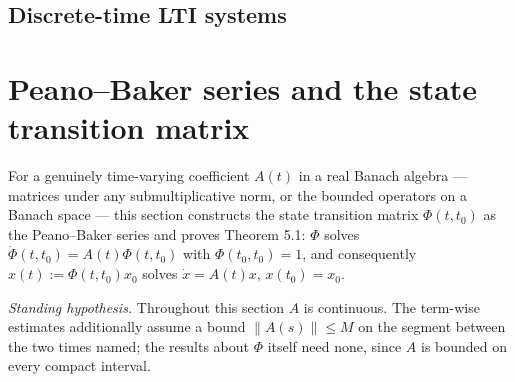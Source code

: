 





\subsection{Discrete-time LTI systems}







\section{Peano--Baker series and the state transition matrix}

For a genuinely time-varying coefficient $A(t)$ in a real Banach algebra --- matrices under
any submultiplicative norm, or the bounded operators on a Banach space --- this section
constructs the state transition matrix $\Phi(t,t_0)$ as the Peano--Baker series and proves
Theorem 5.1: $\Phi$ solves $\dot\Phi(t,t_0) = A(t)\Phi(t,t_0)$ with $\Phi(t_0,t_0) = 1$, and
consequently $x(t) := \Phi(t,t_0)x_0$ solves $\dot x = A(t)x$, $x(t_0) = x_0$.

\emph{Standing hypothesis.} Throughout this section $A$ is continuous. The term-wise estimates
additionally assume a bound $\|A(s)\| \le M$ on the segment between the two times named; the
results about $\Phi$ itself need none, since $A$ is bounded on every compact interval.




